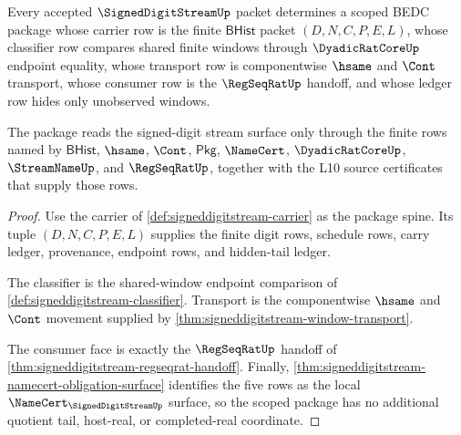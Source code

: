 \begin{theorem}
\label{thm:signeddigitstream-scoped-window-package}
Every accepted $\SignedDigitStreamUp$ packet determines a scoped BEDC package whose carrier row is the finite $\mathsf{BHist}$ packet $(D,N,C,P,E,L)$, whose classifier row compares shared finite windows through $\DyadicRatCoreUp$ endpoint equality, whose transport row is componentwise $\hsame$ and $\Cont$ transport, whose consumer row is the $\RegSeqRatUp$ handoff, and whose ledger row hides only unobserved windows.

The package reads the signed-digit stream surface only through the finite rows named by $\mathsf{BHist}$, $\hsame$, $\Cont$, $\mathsf{Pkg}$, $\NameCert$, $\DyadicRatCoreUp$, $\StreamNameUp$, and $\RegSeqRatUp$, together with the L10 source certificates that supply those rows.
\end{theorem}
\begin{proof}
Use the carrier of \autoref{def:signeddigitstream-carrier} as the package spine. Its tuple $(D,N,C,P,E,L)$ supplies the finite digit rows, schedule rows, carry ledger, provenance, endpoint rows, and hidden-tail ledger.

The classifier is the shared-window endpoint comparison of \autoref{def:signeddigitstream-classifier}. Transport is the componentwise $\hsame$ and $\Cont$ movement supplied by \autoref{thm:signeddigitstream-window-transport}.

The consumer face is exactly the $\RegSeqRatUp$ handoff of \autoref{thm:signeddigitstream-regseqrat-handoff}. Finally, \autoref{thm:signeddigitstream-namecert-obligation-surface} identifies the five rows as the local $\NameCert_{\SignedDigitStreamUp}$ surface, so the scoped package has no additional quotient tail, host-real, or completed-real coordinate.
\end{proof}


